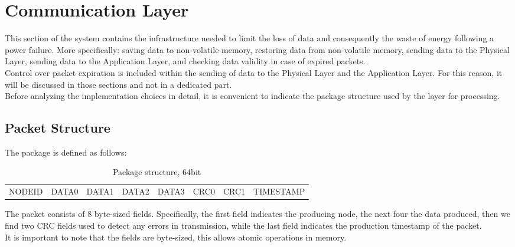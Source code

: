 \section{Communication Layer}
\label{sec:CommunicationLayer}
This section of the system contains the infrastructure needed to limit the loss of data and consequently the waste of energy following a power failure. More specifically: saving data to non-volatile memory, restoring data from non-volatile memory, sending data to the Physical Layer, sending data to the Application Layer, and checking data validity in case of expired packets.\\
Control over packet expiration is included within the sending of data to the Physical Layer and the Application Layer. For this reason, it will be discussed in those sections and not in a dedicated part.\\
Before analyzing the implementation choices in detail, it is convenient to indicate the package structure used by the layer for processing.
\subsection{Packet Structure}
\label{sec:PacketStruct}
 The package is defined as follows:
\begin{table}[H]
\begin{center}
\begin{tabular}{ |c| c| c| c| c| c| c| c|}
 NODEID & DATA0 & DATA1 & DATA2 & DATA3 & CRC0 & CRC1 & TIMESTAMP\\ 
\end{tabular}
\caption{\label{tab:Packet format}Package structure, 64bit}
\end{center}
\end{table}
The packet consists of 8 byte-sized fields. Specifically, the first field indicates the producing node, the next four the data produced, then we find two CRC fields used to detect any errors in transmission, while the last field indicates the production timestamp of the packet.\\
It is important to note that the fields are byte-sized, this allows atomic operations in memory.

